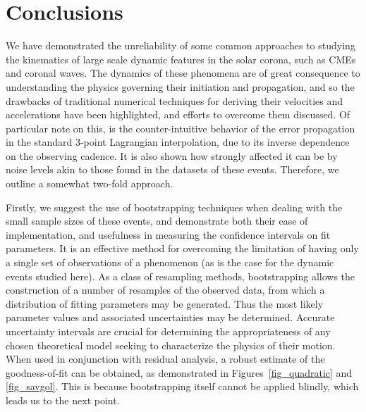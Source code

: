 \documentclass[structabstract]{aa}
\begin{document}
\section{Conclusions}
\label{sect:conclusions}

We have demonstrated the unreliability of some common approaches to studying the kinematics of large scale dynamic features in the solar corona, such as CMEs and coronal waves. The dynamics of these phenomena are of great consequence to understanding the physics governing their initiation and propagation, and so the drawbacks of traditional numerical techniques for deriving their velocities and accelerations have been highlighted, and efforts to overcome them discussed. Of particular note on this, is the counter-intuitive behavior of the error propagation in the standard 3-point Lagrangian interpolation, due to its inverse dependence on the observing cadence. It is also shown how strongly affected it can be by noise levels akin to those found in the datasets of these events. Therefore, we outline a somewhat two-fold approach.

Firstly, we suggest the use of bootstrapping techniques when dealing with the small sample sizes of these events, and demonstrate both their ease of implementation, and usefulness in measuring the confidence intervals on fit parameters. It is an effective method for overcoming the limitation of having only a single set of observations of a phenomenon (as is the case for the dynamic events studied here). As a class of resampling methods, bootstrapping allows the construction of a number of resamples of the observed data, from which a distribution of fitting parameters may be generated. Thus the most likely parameter values and associated uncertainties may be determined. Accurate uncertainty intervals are crucial for determining the appropriateness of any chosen theoretical model seeking to characterize the physics of their motion. When used in conjunction with residual analysis, a robust estimate of the goodness-of-fit can be obtained, as demonstrated in Figures~\ref{fig_quadratic} and \ref{fig_savgol}. This is because bootstrapping itself cannot be applied blindly, which leads us to the next point.
\end{document}

